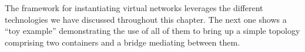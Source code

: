     The framework for instantiating virtual networks leverages the different technologies we have discussed throughout this chapter. The next one shows a ``toy example'' demonstrating the use of all of them to bring up a simple topology comprising two containers and a bridge mediating between them.\\
